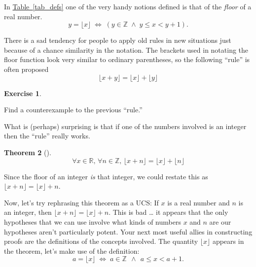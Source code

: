 \documentclass[10pt,]{book}
\theoremstyle{plain}
\newtheorem{theorem}{Theorem}[section]
\theoremstyle{definition}
\theoremstyle{definition}
\newtheorem{exercise}[theorem]{Exercise}
\numberwithin{equation}{section}
\newcommand{\Integers}{{\mathbb Z}}
\newcommand{\Reals}{{\mathbb R}}
\newcommand{\lt}{ < }
\begin{document}
    In \hyperref[tab_defs]{Table~\ref{tab_defs}} one of the very handy notions defined is that
    of the \emph{floor} of a real number.
    \begin{equation*}
      y = \lfloor x \rfloor \; \iff \; (y \in \mathbb Z \; \land \; y \leq x \lt  y+1).
    \end{equation*}
\par

    There is a sad tendency for people to apply old rules in new situations
    just because of a chance similarity in the notation. The brackets used
    in notating the floor function look very similar to ordinary parentheses,
    so the following ``rule'' is often proposed
    \begin{equation*}
      \lfloor x + y \rfloor = \lfloor x \rfloor + \lfloor y \rfloor
    \end{equation*}
\begin{exercise}\label{exercise-17}

        Find a counterexample to the previous ``rule.''
\end{exercise}
\par

    What is (perhaps) surprising is that if one of the numbers involved is an
    integer then the ``rule'' really works.
\begin{theorem}[{}]\label{theorem-6}
\begin{equation*}
        \forall x \in \Reals, \, \forall n \in \Integers, \, 
        \lfloor x + n \rfloor = \lfloor x \rfloor + \lfloor n \rfloor
      \end{equation*}\end{theorem}
\par

    Since the floor of an integer \emph{is} that integer, we could restate this
    as \(\lfloor x + n \rfloor = \lfloor x \rfloor +  n\).
\par

    Now, let's try rephrasing this theorem as a UCS: If \(x\) is a real number
    and \(n\) is an integer, then \(\lfloor x + n \rfloor = \lfloor x \rfloor +  n\).
    This is bad \dots{} it appears that the only hypotheses that we can use
    involve what kinds of numbers \(x\) and \(n\) are \textemdash{} our hypotheses aren't
    particularly potent. Your next most useful allies in constructing proofs
    are the definitions of the concepts involved. The quantity
    \(\lfloor x \rfloor\) appears in the theorem, let's make
    use of the definition:
    \begin{equation*}
      a = \lfloor x  \rfloor \; \iff \; a \in \Integers \; \, 
      \land \; \, a \leq x \lt  a+1.
    \end{equation*}
\par
\end{document}
